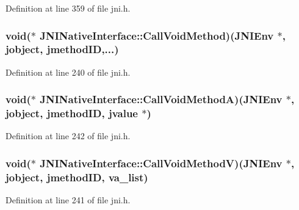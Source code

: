 Definition at line 359 of file jni.\-h.

\hypertarget{struct_j_n_i_native_interface_aebc2e40db63a93626d60dd0d041ad598}{
\subsubsection[{Call\-Void\-Method}]{\setlength{\rightskip}{0pt plus 5cm}void($\ast$ J\-N\-I\-Native\-Interface\-::\-Call\-Void\-Method)({\bf J\-N\-I\-Env} $\ast$, {\bf jobject}, {\bf jmethod\-I\-D},...)}}\label{struct_j_n_i_native_interface_aebc2e40db63a93626d60dd0d041ad598}


Definition at line 240 of file jni.\-h.

\hypertarget{struct_j_n_i_native_interface_aa8c9c1b4adb267e320bcedb71899ad1a}{
\subsubsection[{Call\-Void\-Method\-A}]{\setlength{\rightskip}{0pt plus 5cm}void($\ast$ J\-N\-I\-Native\-Interface\-::\-Call\-Void\-Method\-A)({\bf J\-N\-I\-Env} $\ast$, {\bf jobject}, {\bf jmethod\-I\-D}, {\bf jvalue} $\ast$)}}\label{struct_j_n_i_native_interface_aa8c9c1b4adb267e320bcedb71899ad1a}


Definition at line 242 of file jni.\-h.

\hypertarget{struct_j_n_i_native_interface_af603752cf6192eb3c6a86608c0b37ab3}{
\subsubsection[{Call\-Void\-Method\-V}]{\setlength{\rightskip}{0pt plus 5cm}void($\ast$ J\-N\-I\-Native\-Interface\-::\-Call\-Void\-Method\-V)({\bf J\-N\-I\-Env} $\ast$, {\bf jobject}, {\bf jmethod\-I\-D}, va\-\_\-list)}}\label{struct_j_n_i_native_interface_af603752cf6192eb3c6a86608c0b37ab3}


Definition at line 241 of file jni.\-h.

